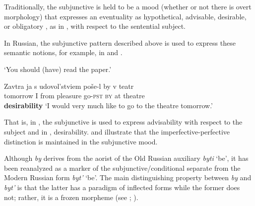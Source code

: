 \documentclass[output=paper,
modfonts,
newtxmath,
hidelinks,
]{langscibook}
\begin{document}
\noindent Traditionally, the subjunctive is held to be a mood (whether or not there is overt morphology) that expresses an eventuality as hypothetical, advisable, desirable, or obligatory \citep[142]{HarrisonLeFleming2000}, as in , with respect to the sentential subject.\largerpage[-1]

\ea \label{ex7}
    \hfill \citep[142]{HarrisonLeFleming2000}
	\z
\z

\noindent In Russian, the subjunctive pattern described above is used to express these semantic notions, for example, in  and .

\ea \label{ex8}
	\z
        \glt `You should (have) read the paper.'\hfill\citep[142]{HarrisonLeFleming2000}
\z

\ea \label{ex9}
\gll Zavtra ja s udovol’stviem poše-l by v teatr\\
     tomorrow I from pleasure go\textsc{-pst} \textsc{by} at theatre\\\hfill\textbf{desirability}
\glt `I would very much like to go to the theatre tomorrow.'
\z

\noindent That is, in , the subjunctive is used to express advisability with respect to the subject and in , desirability.  and  illustrate that the imperfective-perfective distinction is maintained in the subjunctive mood.

Although \textit{by} derives from the aorist of the Old Russian auxiliary \textit{byti} ‘be’, it has been reanalyzed as a marker of the subjunctive/conditional separate from the Modern Russian form \textit{byt’} ‘be’. The main distinguishing property between \textit{by} and \textit{byt’} is that the latter has a paradigm of inflected forms while the former does not; rather, it is a frozen morpheme (see \citealt{Spencer2001}; \citealt{Mezhevich2006}).
\end{document}
